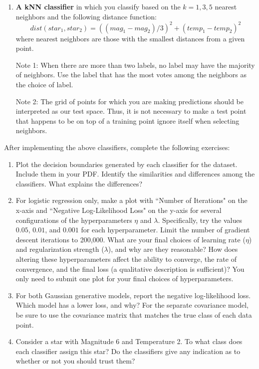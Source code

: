 \documentclass[submit]{harvardml}
\begin{document}
\begin{problem}
\begin{enumerate}[label=\alph*)]
\item \textbf{A kNN classifier} in which you classify based on the $k=1,3,5$ nearest neighbors and the following distance function: $$dist(star_1, star_2) = ((mag_1 - mag_2)/3)^2 + (temp_1 - temp_2)^2$$
where nearest neighbors are those with the smallest distances from a given point.

  Note 1: When there are more than two labels, no label may have the
  majority of neighbors.  Use the label that has the most votes among
  the neighbors as the choice of label. 

  Note 2: The grid of points for which you are making predictions
  should be interpreted as our test space.  Thus, it is not necessary
  to make a test point that happens to be on top of a training point
  ignore itself when selecting neighbors.

\end{enumerate}

After implementing the above classifiers, complete the following exercises:

\begin{enumerate}
    \item Plot the decision boundaries generated by each classifier for the dataset. Include them in your PDF. 
    Identify the similarities and differences among the classifiers. What explains the differences?
    
    \item For logistic regression only,  make a plot with
      ``Number of Iterations" on the x-axis and ``Negative Log-Likelihood Loss" on the y-axis for several
      configurations of the hyperparameters $\eta$ and $\lambda$.  Specifically,  try the values $0.05$,  $0.01$,  and $0.001$ for each hyperparameter.  Limit the number of gradient descent iterations to 200,000.  What are your final choices of learning rate
      ($\eta$) and regularization strength ($\lambda$), and why are they reasonable? How
      does altering these hyperparameters affect the ability to converge,  the rate of convergence,  and the final loss (a qualitative description is sufficient)? You only need to submit one plot for your final choices of hyperparameters.

    \item For both Gaussian generative models, report the negative log-likelihood loss. Which model has a lower loss, and why?
      For the separate covariance model, be sure to use
      the covariance matrix that matches the true class of each data
      point.
    
    \item Consider a star with Magnitude 6 and Temperature 2.
      To what class does each classifier assign this star? Do the
      classifiers give any indication as to whether or not you should
  trust them?
\end{enumerate}
\end{problem}
\end{document}
